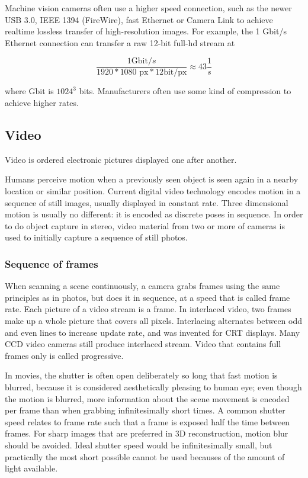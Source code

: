 Machine vision cameras often use a higher speed connection, such as the newer USB 3.0, IEEE 1394 (FireWire), fast Ethernet or Camera Link to achieve realtime lossless transfer of high-resolution images.
For example, the 1 Gbit/s Ethernet connection can transfer a raw 12-bit full-hd stream at

\[
	\frac{1 \text{Gbit}/s}{1920 * 1080 \text{ px} * 12 \text{bit}/\text{px}} \approx 43 \frac{1}{s}
\]

where Gbit is $1024^3$ bits.
Manufacturers often use some kind of compression to achieve higher rates.



\subsection{Video} %

Video is ordered electronic pictures displayed one after another.



Humans perceive motion when a previously seen object is seen again in a nearby location or similar position.
Current digital video technology encodes motion in a sequence of still images, usually displayed in constant rate.
Three dimensional motion is usually no different: it is encoded as discrete poses in sequence.
In order to do object capture in stereo, video material from two or more of cameras is used to initially capture a sequence of still photos.


\subsubsection{Sequence of frames} %

When scanning a scene continuously, a camera grabs frames using the same principles as in photos, but does it in sequence, at a speed that is called frame rate.
Each picture of a video stream is a frame.
In interlaced video, two frames make up a whole picture that covers all pixels.
Interlacing alternates between odd and even lines to increase update rate, and was invented for CRT displays.
Many CCD video cameras still produce interlaced stream.
Video that contains full frames only is called progressive.

In movies, the shutter is often open deliberately so long that fast motion is blurred, because it is considered aesthetically pleasing to human eye; even though the motion is blurred, more information about the scene movement is encoded per frame than when grabbing infinitesimally short times.
A common shutter speed relates to frame rate such that a frame is exposed half the time between frames.
\cite{wilson2004anton}
For sharp images that are preferred in 3D reconstruction, motion blur should be avoided.
Ideal shutter speed would be infinitesimally small, but practically the most short possible cannot be used becauses of the amount of light available.

